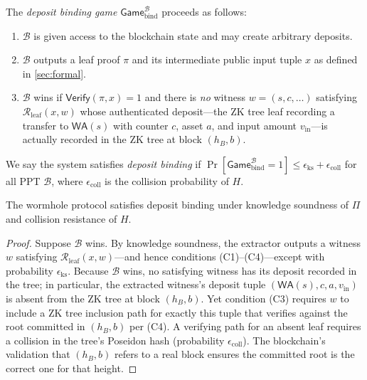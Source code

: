 \documentclass{iacrcc}
\newcommand{\WA}{\mathsf{WA}}
\begin{document}
\begin{definition}
The \emph{deposit binding game} \(\mathsf{Game}_{\mathrm{bind}}^{\mathcal{B}}\) proceeds as follows:
\begin{enumerate}
    \item \(\mathcal{B}\) is given access to the blockchain state and may create arbitrary deposits.
    \item \(\mathcal{B}\) outputs a leaf proof \(\pi\) and its intermediate public input tuple \(x\) as defined in \cref{sec:formal}.
    \item \(\mathcal{B}\) wins if \(\mathsf{Verify}(\pi, x) = 1\) and there is \emph{no} witness \(w = (s, c, \ldots)\) satisfying \(\mathcal{R}_{\mathrm{leaf}}(x, w)\) whose authenticated deposit---the ZK tree leaf recording a transfer to \(\WA(s)\) with counter \(c\), asset \(a\), and input amount \(v_{\mathrm{in}}\)---is actually recorded in the ZK tree at block \((h_B, b)\).
\end{enumerate}
We say the system satisfies \emph{deposit binding} if \(\Pr[\mathsf{Game}_{\mathrm{bind}}^{\mathcal{B}} = 1] \leq \epsilon_{\mathrm{ks}} + \epsilon_{\mathrm{coll}}\) for all PPT \(\mathcal{B}\), where \(\epsilon_{\mathrm{coll}}\) is the collision probability of \(H\).
\end{definition}

\begin{theorem}
The wormhole protocol satisfies deposit binding under knowledge soundness of \(\Pi\) and collision resistance of \(H\).
\end{theorem}

\begin{proof}
Suppose \(\mathcal{B}\) wins. By knowledge soundness, the extractor outputs a witness \(w\) satisfying \(\mathcal{R}_{\mathrm{leaf}}(x, w)\)---and hence conditions (C1)--(C4)---except with probability \(\epsilon_{\mathrm{ks}}\). Because \(\mathcal{B}\) wins, no satisfying witness has its deposit recorded in the tree; in particular, the extracted witness's deposit tuple \((\WA(s), c, a, v_{\mathrm{in}})\) is absent from the ZK tree at block \((h_B, b)\). Yet condition (C3) requires \(w\) to include a ZK tree inclusion path for exactly this tuple that verifies against the root committed in \((h_B, b)\) per (C4). A verifying path for an absent leaf requires a collision in the tree's Poseidon hash (probability \(\epsilon_{\mathrm{coll}}\)). The blockchain's validation that \((h_B, b)\) refers to a real block ensures the committed root is the correct one for that height.
\end{proof}
\end{document}
